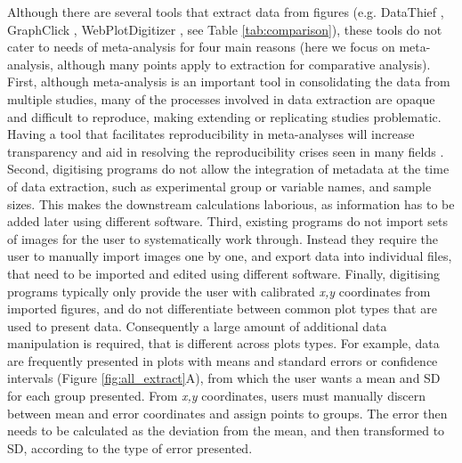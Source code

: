 \documentclass[12pt]{article}
\let\proglang=\textsf
\begin{document}
Although there are several tools that extract data from figures (e.g. \proglang{DataThief} \citep{DataThief}, \proglang{GraphClick} \citep{GraphClick}, \proglang{WebPlotDigitizer} \citep{WebPlotDigitizer}, see Table \ref{tab:comparison}), these tools do not cater to needs of meta-analysis for four main reasons (here we focus on meta-analysis, although many  points apply to extraction for comparative analysis). First, although meta-analysis is an important tool in consolidating the data from multiple studies, many of the processes involved in data extraction are opaque and difficult to reproduce, making extending or replicating studies problematic. Having a tool that facilitates reproducibility in meta-analyses will increase transparency and aid in resolving the reproducibility crises seen in many fields \citep{peng_reproducible_2006, peng_reproducible_2011, Parker2016}. Second, digitising programs do not allow the integration of metadata at the time of data extraction, such as experimental group or variable names, and sample sizes. This makes the downstream calculations laborious, as information has to be added later using different software. Third, existing programs do not import sets of images for the user to systematically work through. Instead they require the user to manually import images one by one, and export data into individual files, that need to be imported and edited using different software. Finally, digitising programs typically only provide the user with calibrated \textit{x,y} coordinates from imported figures, and do not differentiate between common plot types that are used to present data. Consequently a large amount of additional data manipulation is required, that is different across plots types. For example, data are frequently presented in plots with means and standard errors or confidence intervals (Figure \ref{fig:all_extract}A), from which the user wants a mean and SD for each group presented. From \textit{x,y} coordinates, users must manually discern between mean and error coordinates and assign points to groups. The error then needs to be calculated as the deviation from the mean, and then transformed to SD, according to the type of error presented. 
\end{document}
